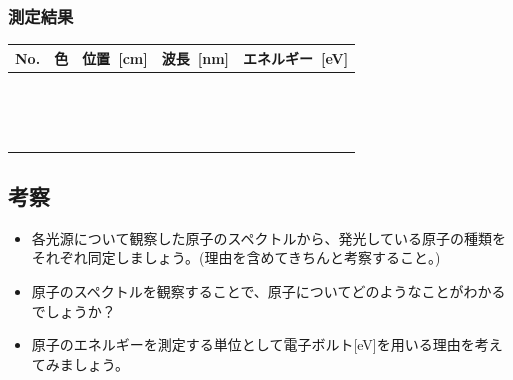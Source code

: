 \subsubsection*{測定結果}
\hspace*{-\parindent}
\begin{tabular}{|c|c|c|c|c|}
\hline
No. & 色 & 位置~[cm] & 波長~[nm] & エネルギー~[eV] \\
\hline\hline
\hspace*{1.5cm}&\hspace*{2cm}&\hspace*{3.5cm}&\hspace*{3.5cm}&\hspace*{3.5cm}\\
\hline
&&&&\\
\hline
&&&&\\
\hline
&&&&\\
\hline
&&&&\\
\hline
&&&&\\
\hline
&&&&\\
\hline
&&&&\\
\hline
&&&&\\
\hline
&&&&\\
\hline
&&&&\\
\hline
&&&&\\
\hline
&&&&\\
\hline
&&&&\\
\hline
&&&&\\
\hline
\end{tabular}


\subsection*{考察}

\begin{itemize}

\item 各光源について観察した原子のスペクトルから、発光している原子の種類をそれぞれ同定しましょう。(理由を含めてきちんと考察すること。)


\vspace*{6cm}

\item 原子のスペクトルを観察することで、原子についてどのようなことがわかるでしょうか？

\vspace{6cm}

\item 原子のエネルギーを測定する単位として電子ボルト[eV]を用いる理由を考えてみましょう。
\end{itemize}
